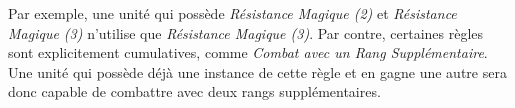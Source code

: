 Par exemple, une unité qui possède \emph{Résistance Magique (2)} et \emph{Résistance Magique (3)} n'utilise que \emph{Résistance Magique (3)}. Par contre, certaines règles sont explicitement cumulatives, comme \emph{Combat avec un Rang Supplémentaire}. Une unité qui possède déjà une instance de cette règle et en gagne une autre sera donc capable de combattre avec deux rangs supplémentaires. 
